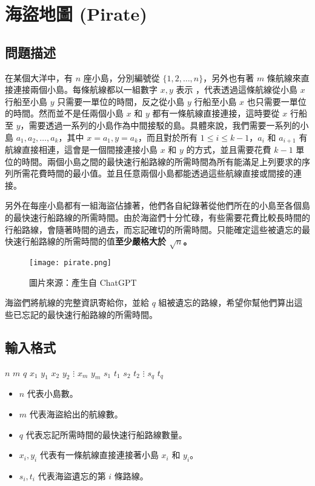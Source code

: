 \section{海盜地圖 (Pirate)}

\subsection{問題描述}

在某個大洋中，有 \(n\) 座小島，分別編號從
\(\{1, 2, \ldots, n\}\)，另外也有著 \(m\)
條航線來直接連接兩個小島。每條航線都以一組數字 \(x, y\) 表示
，代表透過這條航線從小島 \(x\) 行船至小島 \(y\)
只需要一單位的時間，反之從小島 \(y\) 行船至小島 \(x\)
也只需要一單位的時間。然而並不是任兩個小島 \(x\) 和 \(y\)
都有一條航線直接連接，這時要從 \(x\) 行船至
\(y\)，需要透過一系列的小島作為中間接駁的島。具體來說，我們需要一系列的小島
\(a_1, a_2, \ldots, a_k\)，其中 \(x = a_1,y = a_k\)，而且對於所有
\(1 \leq i \leq k-1\)，\(a_i\) 和 \(a_{i+1}\)
有航線直接相連，這會是一個間接連接小島 \(x\) 和 \(y\)
的方式，並且需要花費 \(k-1\)
單位的時間。兩個小島之間的最快速行船路線的所需時間為所有能滿足上列要求的序列所需花費時間的最小值。並且任意兩個小島都能透過這些航線直接或間接的連接。

另外在每座小島都有一組海盜佔據著，他們各自紀錄著從他們所在的小島至各個島的最快速行船路線的所需時間。由於海盜們十分忙碌，有些需要花費比較長時間的行船路線，會隨著時間的過去，而忘記確切的所需時間。只能確定這些被遺忘的最快速行船路線的所需時間的值\textbf{至少嚴格大於
\(\sqrt{n}\)。}

\begin{figure}[!htb]
  \centering
  \texttt{[image: pirate.png]}
  \caption{圖片來源：產生自 ChatGPT}
\end{figure}

海盜們將航線的完整資訊寄給你，並給 \(q\)
組被遺忘的路線，希望你幫他們算出這些已忘記的最快速行船路線的所需時間。

\subsection{輸入格式}

\begin{format}
\f{
$n$ $m$ $q$
$x_1$ $y_1$
$x_2$ $y_2$
$\vdots$
$x_m$ $y_m$
$s_1$ $t_1$
$s_2$ $t_2$
$\vdots$
$s_q$ $t_q$
}
\end{format}

\begin{itemize}
\tightlist
\item
  \(n\) 代表小島數。
\item
  \(m\) 代表海盜給出的航線數。
\item
  \(q\) 代表忘記所需時間的最快速行船路線數量。
\item
  \(x_i, y_i\) 代表有一條航線直接連接著小島 \(x_i\) 和 \(y_i\)。
\item
  \(s_i, t_i\) 代表海盜遺忘的第 \(i\) 條路線。
\end{itemize}

